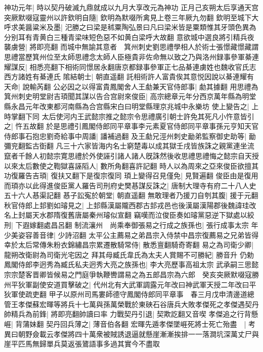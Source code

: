 神功元年|{
	時以契丹破滅九鼎就成以九月大享改元為神功}
正月己亥朔太后享通天宫　突厥默啜寇靈州以許欽明自隨|{
	欽明為默啜所禽見上卷三年厥九勿翻}
欽明至城下大呼求美醤粱米及墨|{
	汜勝之曰梁是秫粟陶弘景曰凡曰梁米皆是粟類惟其牙頭色異為分别耳有青黄白三種青梁味短色惡不如黄白梁呼大故翻}
意欲城中選良將引精兵夜襲虜營|{
	將即亮翻}
而城中無諭其意者　箕州刺史劉思禮學相人於術士張憬藏憬藏謂思禮當歷箕州位至太師思禮念太師人臣極貴非佐命無以致之乃與洛州録事參軍綦連耀謀反|{
	相悉亮翻下相術同憬居永翻唐京都録事參軍正七品綦連虜姓也魏收官氏志西方諸姓有綦連氏}
隂結朝士|{
	朝直遥翻}
託相術許人富貴俟其意悦因說以綦連耀有天命|{
	說輸芮翻}
公必因之以得富貴鳳閣舍人王勮兼天官侍郎事|{
	勮其據翻}
用思禮為箕州刺史明堂尉吉頊聞其謀以告合宫尉來俊臣|{
	高宗總章元年分西京萬年縣為明堂縣永昌元年改東都河南縣為合宫縣宋白曰明堂縣理京兆城中永樂坊}
使上變告之|{
	上時掌翻下同}
太后使河内王武懿宗推之懿宗令思禮廣引朝士許免其死凡小忤意皆引之|{
	忤五故翻}
於是思禮引鳳閣侍郎同平章事李元素夏官侍郎同平章事孫元亨知天官侍郎事石抱忠劉奇給事中周譒|{
	譒補過翻}
及王勮兄涇州刺史勔弟監察御史助等|{
	勔彌兖翻監古衘翻}
凡三十六家皆海内名士窮楚毒以成其獄壬戌皆族誅之親黨連坐流竄者千餘人初懿宗寛思禮於外使誣引諸人諸人旣誅然後收思禮思禮悔之懿宗自天授以來太后數使之鞫獄喜誣䧟人|{
	數所角翻喜許記翻}
時人以為周來之亞來俊臣欲擅其功復羅告吉頊|{
	復扶又翻下是復宗復同}
頊上變得召見僅免|{
	見賢遍翻}
俊臣由是復用而頊亦以此得進俊臣黨人羅告司刑府史樊惎謀反誅之|{
	唐制大理寺有府二十八人史五十六人惎渠記翻}
惎子訟寃於朝堂|{
	朝直遥翻}
無敢理者乃援刀自刳其腹|{
	援于元翻}
秋官侍郎上邽劉如璿見之|{
	上邽縣漢屬隴西郡古邽戎邑也後漢屬漢陽郡後魏諱珪改名上封屬天水郡隋復舊唐屬秦州璿似宣翻}
竊嘆而泣俊臣奏如璿黨惡逆下獄處以絞刑|{
	下遐嫁翻處昌呂翻}
制流瀼州　尚乘奉御張易之行成之族孫也|{
	張行成事太宗}
年少美姿容善音律|{
	少詩沼翻}
太平公主薦易之弟昌宗入侍禁中昌宗復薦易之兄弟皆得幸於太后常傳朱粉衣錦繡昌宗累遷散騎常侍|{
	散悉亶翻騎奇寄翻}
易之為司衛少卿|{
	龍朔改衛尉為司衛光宅因之}
拜其母臧氏韋氏為太夫人賞賜不可勝紀|{
	勝音升}
仍勅鳳閣侍郎李迥秀為臧氏私夫迥秀大亮之族孫也|{
	李大亮歷事高祖太宗}
武承嗣三思懿宗宗楚客晋卿皆候易之門庭爭執鞭轡謂易之為五郎昌宗為六郎　癸亥突厥默啜寇勝州平狄軍副使安道買擊破之|{
	代州北有大武軍調露元年改曰神武軍天授二年改曰平狄軍使疏吏翻}
甲子以原州司馬婁師德守鳳閣侍郎同平章事　春三月戊申清邊道總管王孝傑蘇宏暉等將兵十七萬與孫萬榮戰於東硤石谷唐兵大敗孝傑死之孝傑遇契丹帥精兵為前鋒|{
	將即亮翻帥讀曰率}
力戰契丹引退|{
	契欺訖翻又音喫}
孝傑追之行背懸崕|{
	背蒲妹翻}
契丹回兵薄之|{
	薄音伯各翻}
宏暉先遁孝傑墜崕死將士死亡殆盡　|{
	考異曰朝野僉載云孝傑將四十萬衆被賊誘退逼就懸崖漸漸挨排一一落澗坑深萬丈尸與崖平匹馬無歸單兵莫返張鷟語事多過其實今不盡取}

